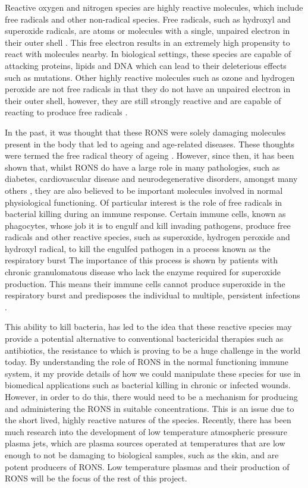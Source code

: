\documentclass[11pt, oneside]{article}   	%
\begin{document}
Reactive oxygen and nitrogen species are highly reactive molecules, which include free radicals and other non-radical species. 
Free radicals, such as hydroxyl and superoxide radicals, are atoms or molecules with a single, unpaired electron in their outer shell \cite{PhamHuy2008}. 
This free electron results in an extremely high propensity to react with molecules nearby. 
In biological settings, these species are capable of attacking proteins, lipids and DNA \cite{PhamHuy2008} which can lead to their deleterious effects such as mutations.
Other highly reactive molecules such as ozone and hydrogen peroxide are not free radicals in that they do not have an unpaired electron in their outer shell, however, they are still strongly reactive and are capable of reacting to produce free radicals \cite{PhamHuy2008}.

In the past, it was thought that these RONS were solely damaging molecules present in the body that led to ageing and age-related diseases.
These thoughts were termed the free radical theory of ageing \cite{Harman1955}. 
However, since then, it has been shown that, whilst RONS do have a large role in many pathologies, such as diabetes, cardiovascular disease and neurodegenerative disorders, amongst many others \cite{Valko2007}, they are also believed to be important molecules involved in normal physiological functioning.
Of particular interest is the role of free radicals in bacterial killing during an immune response.
Certain immune cells, known as phagocytes, whose job it is to engulf and kill invading pathogens, produce free radicals and other reactive species, such as superoxide, hydrogen peroxide and hydroxyl radical, to kill the engulfed pathogen in a process known as the respiratory burst \cite{Janeway2011}
The importance of this process is shown by patients with chronic granulomatous disease who lack the enzyme required for superoxide production. This means their immune cells cannot produce superoxide in the respiratory burst and predisposes the individual to multiple, persistent infections \cite{Janeway2011, Babior2004}.


This ability to kill bacteria, has led to the idea that these reactive species may provide a potential alternative to conventional bactericidal therapies such as antibiotics, the resistance to which is proving to be a huge challenge in the world today. 
By understanding the role of RONS in the normal functioning immune system, it my provide details of how we could manipulate these species for use in biomedical applications such as bacterial killing in chronic or infected wounds.
However, in order to do this, there would need to be a mechanism for producing and administering the RONS in suitable concentrations.
This is an issue due to the short lived, highly reactive natures of the species.
Recently, there has been much research into the development of low temperature atmospheric pressure plasma jets, which are plasma sources operated at temperatures that are low enough to not be damaging to biological samples, such as the skin, and are potent producers of RONS. 
Low temperature plasmas and their production of RONS will be the focus of the rest of this project.
\end{document}
